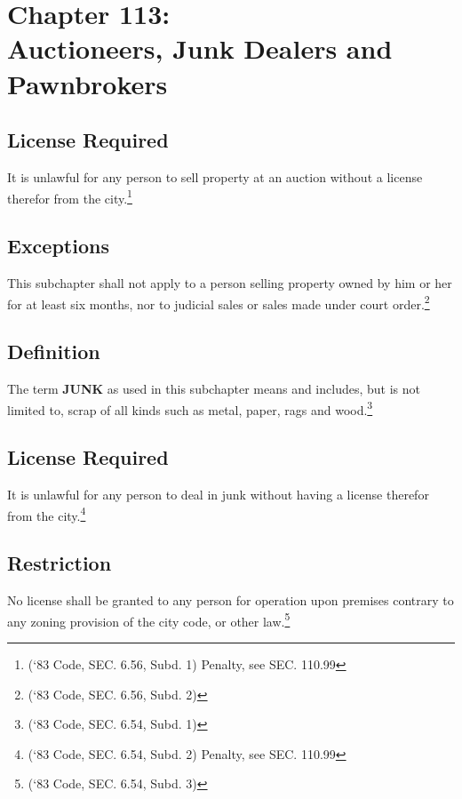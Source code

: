 \chapter*{Chapter 113: \\
	Auctioneers, Junk Dealers and Pawnbrokers}
    \minitoc
    \pagebreak


\section{License Required}
It is unlawful for any person to sell property at an auction without a license therefor from the city.\footnote{(‘83 Code, SEC. 6.56, Subd. 1)  Penalty, see SEC. 110.99}

\section{Exceptions}
This subchapter shall not apply to a person selling property owned by him or her for at least six months, nor to judicial sales or sales made under court order.\footnote{(‘83 Code, SEC. 6.56, Subd. 2)}


\setcounter{section}{14}
\section{Definition}
The term \textbf{JUNK} as used in this subchapter means and includes, but is not limited to, scrap of all kinds such as metal, paper, rags and wood.\footnote{(‘83 Code, SEC. 6.54, Subd. 1)}

\section{License Required}
It is unlawful for any person to deal in junk without having a license therefor from the city.\footnote{(‘83 Code, SEC. 6.54, Subd. 2)  Penalty, see SEC. 110.99}

\section{Restriction}
No license shall be granted to any person for operation upon premises contrary to any zoning provision of the city code, or other law.\footnote{(‘83 Code, SEC. 6.54, Subd. 3)}


